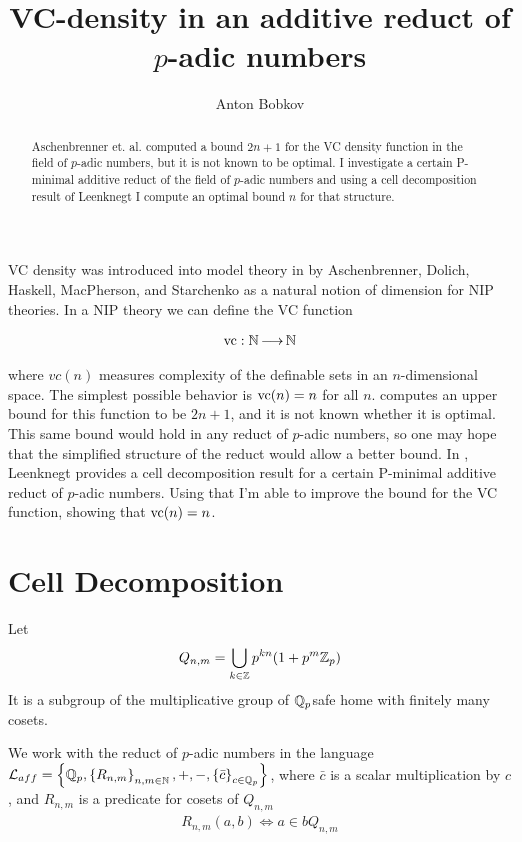 \documentclass{amsart}
\title{VC-density in an additive reduct of $p$-adic numbers}
\author{Anton Bobkov}
\renewcommand{\LL}{\mathcal L_{aff}}
\newcommand{\curly}[1]{\left\{#1\right\}}
\begin{document}
\begin{abstract}
	Aschenbrenner et. al. computed a bound $2n+1$ for the VC density function in the field of $p$-adic numbers, but it is not known to be optimal.
	I investigate a certain P-minimal additive reduct of the field of $p$-adic numbers and using a cell decomposition result of Leenknegt I compute an optimal bound $n$ for that structure.
\end{abstract}


\maketitle

VC density was introduced into model theory in \cite{density} by Aschenbrenner, Dolich, Haskell, MacPherson, and Starchenko as a natural notion of dimension for NIP theories.
In a NIP theory we can define the VC function

\begin{align*}
	\operatorname{vc} : \mathbb{N} \operatorname{\longrightarrow} \mathbb{N}
\end{align*}

where $vc(n)$ measures complexity of the definable sets in an $n$-dimensional space.
The simplest possible behavior is $\operatorname{vc}(n) = n$ for all $n$.
\cite{density} computes an upper bound for this function to be $2n+1$, and it is not known whether it is optimal.
This same bound would hold in any reduct of $p$-adic numbers, so one may hope that the simplified structure of the reduct would allow a better bound.
In \cite{reduct}, Leenknegt provides a cell decomposition result for a certain P-minimal additive reduct of $p$-adic numbers.
Using that I'm able to improve the bound for the VC function, showing that $\operatorname{vc}(n) = n$.


\section{Cell Decomposition}


\begin{Definition}
	Let
	\begin{align*}
		Q_{n,m} = \bigcup_{k \in \mathbb{Z}} p^{kn} (1 + p^m\mathbb{Z}_p) 
	\end{align*}
	It is a subgroup of the multiplicative group of $\mathbb{Q}_p$safe home with finitely many cosets.
\end{Definition}

We work with the reduct of $p$-adic numbers in the language $\LL = \curly{\Q_p, \curly{R_{n,m}}_{n,m\in \N}, +, -, \curly{\bar c}_{c \in \Q_p} }$,
where $\bar c$ is a scalar multiplication by $c$, and $R_{n,m}$ is a predicate for cosets of $Q_{n,m}$
\begin{align*}
	R_{n,m} (a, b) \Leftrightarrow a \in b Q_{n,m}
\end{align*}
\end{document}
